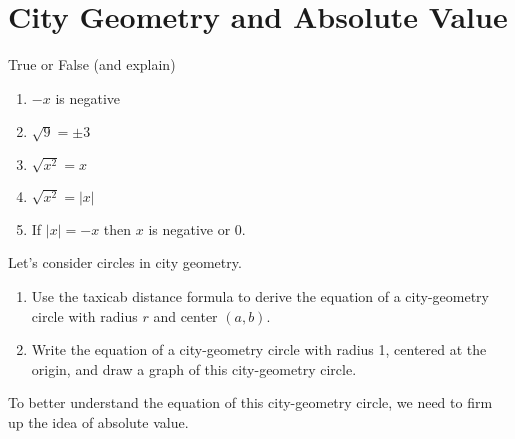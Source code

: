 \newpage

\section{City Geometry and Absolute Value}

\begin{prob}
True or False (and explain)
\begin{enumerate}
\item $-x$ is negative
\item $\sqrt{9} = \pm 3$
\item $\sqrt{x^2} = x$
\item $\sqrt{x^2} = |x|$
\item If $|x| = -x$ then $x$ is negative or 0. 
\end{enumerate}
\end{prob}

\begin{prob}
Let's consider circles in city geometry.  
\begin{enumerate}
\item Use the taxicab distance formula to derive the equation of a city-geometry circle with radius $r$ and center $(a, b)$.  
\item Write the equation of a city-geometry circle with radius 1, centered at the origin, and draw a graph of this city-geometry circle.  
\end{enumerate}
\end{prob}

To better understand the equation of this city-geometry circle, we need to firm up the idea of absolute value.  


